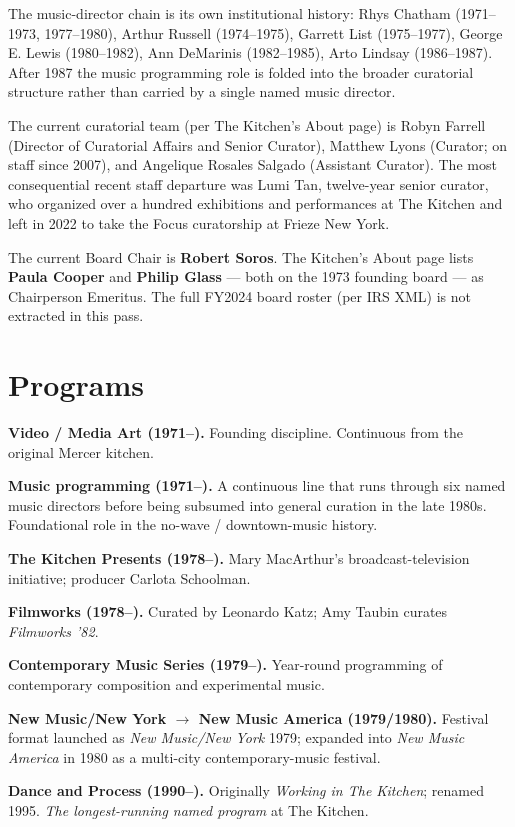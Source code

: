 \documentclass[10pt,letterpaper,twocolumn]{article}
\begin{document}
The music-director chain is its own institutional history: Rhys Chatham (1971--1973, 1977--1980), Arthur Russell (1974--1975), Garrett List (1975--1977), George E. Lewis (1980--1982), Ann DeMarinis (1982--1985), Arto Lindsay (1986--1987). After 1987 the music programming role is folded into the broader curatorial structure rather than carried by a single named music director.

The current curatorial team (per The Kitchen's About page) is Robyn Farrell (Director of Curatorial Affairs and Senior Curator), Matthew Lyons (Curator; on staff since 2007), and Angelique Rosales Salgado (Assistant Curator). The most consequential recent staff departure was Lumi Tan, twelve-year senior curator, who organized over a hundred exhibitions and performances at The Kitchen and left in 2022 to take the Focus curatorship at Frieze New York.

The current Board Chair is \textbf{Robert Soros}. The Kitchen's About page lists \textbf{Paula Cooper} and \textbf{Philip Glass} --- both on the 1973 founding board --- as Chairperson Emeritus. The full FY2024 board roster (per IRS XML) is not extracted in this pass.

\section{Programs}

\textbf{Video / Media Art (1971--).} Founding discipline. Continuous from the original Mercer kitchen.

\textbf{Music programming (1971--).} A continuous line that runs through six named music directors before being subsumed into general curation in the late 1980s. Foundational role in the no-wave / downtown-music history.

\textbf{The Kitchen Presents (1978--).} Mary MacArthur's broadcast-television initiative; producer Carlota Schoolman.

\textbf{Filmworks (1978--).} Curated by Leonardo Katz; Amy Taubin curates \emph{Filmworks '82}.

\textbf{Contemporary Music Series (1979--).} Year-round programming of contemporary composition and experimental music.

\textbf{New Music/New York $\to$ New Music America (1979/1980).} Festival format launched as \emph{New Music/New York} 1979; expanded into \emph{New Music America} in 1980 as a multi-city contemporary-music festival.

\textbf{Dance and Process (1990--).} Originally \emph{Working in The Kitchen}; renamed 1995. \emph{The longest-running named program} at The Kitchen.
\end{document}
